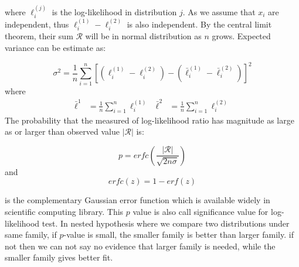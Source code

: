 \begin{appendices}
where $ \ell_{i}^{(j)}$ is the log-likelihood in distribution $j$.
As we assume that $x_i$ are independent, thus $\ell_{i}^{(1)} - \ell_{i}^{(2)}$ is also independent. 
By the central limit theorem, their sum $\mathcal{R}$ will be in normal distribution as $n$ grows.
Expected variance can be estimate as:

\begin{equation}
	\sigma^2 = \frac{1}{n} \sum_{i=1}^{n}[(\ell_{i}^{(1)} - \ell_{i}^{(2)}) - (\bar{\ell}_{i}^{(1)} - \bar{\ell}_{i}^{(2)})]^2
\end{equation}
where 
\begin{align}
	\bar{\ell}^1 & = \frac{1}{n} \sum_{i=1}^{n} \ell_{i}^{(1)} & \bar{\ell}^2 & = \frac{1}{n} \sum_{i=1}^{n} \ell_{i}^{(2)}
\end{align}
The probability that the measured of log-likelihood ratio has magnitude as large as or larger than observed value $|\mathcal{R}|$ is: 

\begin{equation}
 p = erfc (\frac{|\mathcal{R}|} { \sqrt{2n\sigma}})
\end{equation}
and 
\begin{equation}
 erfc(z) = 1 - erf(z)
\end{equation}

is the complementary Gaussian error function which is available widely in scientific computing library.
This $p$ value is also call significance value for log-likelihood test. 
In nested hypothesis where we compare two distributions under same family, if $p$-value is small, the smaller family is better than larger family.
if not then we can not say no evidence that larger family is needed, while the smaller family gives better fit. 





\end{appendices}